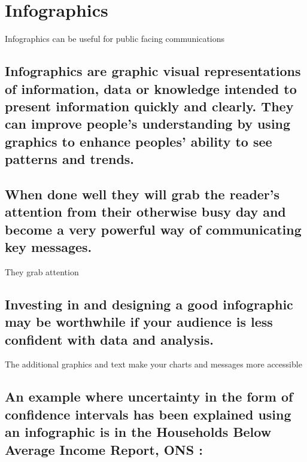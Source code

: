 \documentclass[]{book}
\begin{document}
\section{Infographics}\label{infographics}

 Infographics can be useful for public facing communications

\subsection{Infographics are graphic visual representations of
information, data or knowledge intended to present information quickly
and clearly. They can improve people's understanding by using graphics
to enhance peoples' ability to see patterns and
trends.}\label{infographics-are-graphic-visual-representations-of-information-data-or-knowledge-intended-to-present-information-quickly-and-clearly.-they-can-improve-peoples-understanding-by-using-graphics-to-enhance-peoples-ability-to-see-patterns-and-trends.}

\subsection{When done well they will grab the reader's attention from
their otherwise busy day and become a very powerful way of communicating
key
messages.}\label{when-done-well-they-will-grab-the-readers-attention-from-their-otherwise-busy-day-and-become-a-very-powerful-way-of-communicating-key-messages.}

 They grab attention

\subsection{Investing in and designing a good infographic may be
worthwhile if your audience is less confident with data and
analysis.}\label{investing-in-and-designing-a-good-infographic-may-be-worthwhile-if-your-audience-is-less-confident-with-data-and-analysis.}

 The additional graphics and text make your charts and messages more
accessible

\subsection{An example where uncertainty in the form of confidence
intervals has been explained using an infographic is in the Households
Below Average Income Report, ONS
:}\label{an-example-where-uncertainty-in-the-form-of-confidence-intervals-has-been-explained-using-an-infographic-is-in-the-households-below-average-income-report-ons}
\end{document}
